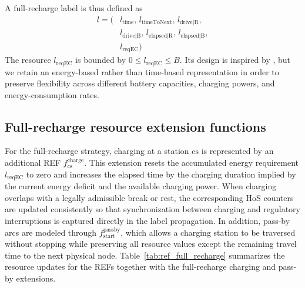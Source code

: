 \documentclass[3p,11pt,authoryear]{elsarticle}  %
\begin{document}
A full-recharge label is thus defined as
\[
\begin{aligned}
l = (&l_{\text{time}},\, l_{\text{timeToNext}},\, l_{\text{drive|R}},\\
     &l_{\text{drive|B}},\, l_{\text{elapsed|R}},\, l_{\text{elapsed|B}},\\
     &l_{\text{reqEC}})
\end{aligned}
\]
The resource \(l_{\text{reqEC}}\) is bounded by \(0 \leq l_{\text{reqEC}} \leq B\). Its design is inspired by \citet{desaulniers2016exact}, but we retain an energy-based rather than time-based representation in order to preserve flexibility across different battery capacities, charging powers, and energy-consumption rates.


\subsection{Full-recharge resource extension functions}


For the full-recharge strategy, charging at a station \(\mathrm{cs}\) is represented by an additional REF \(f^{\text{charge}}_{\mathrm{cs}}\). This extension resets the accumulated energy requirement \(l_{\text{reqEC}}\) to zero and increases the elapsed time by the charging duration implied by the current energy deficit and the available charging power. When charging overlaps with a legally admissible break or rest, the corresponding HoS counters are updated consistently so that synchronization between charging and regulatory interruptions is captured directly in the label propagation. In addition, pass-by arcs are modeled through \(f^{\text{passby}}_{\text{start}}\), which allows a charging station to be traversed without stopping while preserving all resource values except the remaining travel time to the next physical node. Table~\ref{tab:ref_full_recharge} summarizes the resource updates for the REFs together with the full-recharge charging and pass-by extensions.
\end{document}
